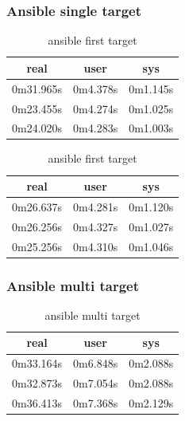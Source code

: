 \documentclass[10pt,]{report}
\begin{document}
\begin{adjustwidth}{20pt}{}
	\subsubsection{Ansible single target}
	\begin{table}[H]
		\caption{ansible first target}
		\begin{center}
			\begin{tabular}[c]{|c|c|c|}
				\hline
				\multicolumn{1}{|c|}{\textbf{real}} &
				\multicolumn{1}{c|}{\textbf{user}}  &
				\multicolumn{1}{c|}{\textbf{sys}}                         \\
				\hline
				0m31.965s                           & 0m4.378s & 0m1.145s \\
				\hline
				0m23.455s                           & 0m4.274s & 0m1.025s \\
				\hline
				0m24.020s                           & 0m4.283s & 0m1.003s \\
				\hline
			\end{tabular}
		\end{center}
	\end{table}
	\begin{table}[H]
		\caption{ansible first target}
		\begin{center}
			\begin{tabular}[c]{|c|c|c|}
				\hline
				\multicolumn{1}{|c|}{\textbf{real}} &
				\multicolumn{1}{c|}{\textbf{user}}  &
				\multicolumn{1}{c|}{\textbf{sys}}                         \\
				\hline
				0m26.637s                           & 0m4.281s & 0m1.120s \\
				\hline
				0m26.256s                           & 0m4.327s & 0m1.027s \\
				\hline
				0m25.256s                           & 0m4.310s & 0m1.046s \\
				\hline
			\end{tabular}
		\end{center}
	\end{table}
	\subsubsection{Ansible multi target}
	\begin{table}[H]
		\caption{ansible multi target}
		\begin{center}
			\begin{tabular}[c]{|c|c|c|}
				\hline
				\multicolumn{1}{|c|}{\textbf{real}} &
				\multicolumn{1}{c|}{\textbf{user}}  &
				\multicolumn{1}{c|}{\textbf{sys}}                         \\
				\hline
				0m33.164s                           & 0m6.848s & 0m2.088s \\
				\hline
				0m32.873s                           & 0m7.054s & 0m2.088s \\
				\hline
				0m36.413s                           & 0m7.368s & 0m2.129s \\
				\hline
			\end{tabular}
		\end{center}
	\end{table}

\end{adjustwidth}
\end{document}
